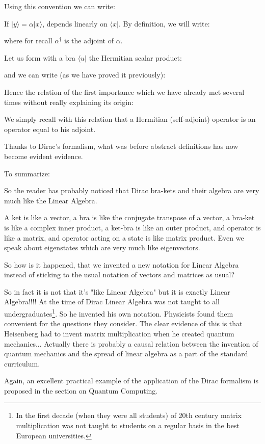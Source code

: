 	Using this convention we can write:
	
	If $|y\rangle=\alpha|x\rangle$, depends linearly on $\langle x|$. By definition, we will write:
	
	where for recall $\alpha^\dagger$ is the adjoint of $\alpha$.
	
	Let us form with a bra $\langle u|$ the Hermitian scalar product:
	
	and we can write (as we have proved it previously):
	
	Hence the relation of the first importance which we have already met several times without really explaining its origin:
	
	We simply recall with this relation that a Hermitian (self-adjoint) operator is an operator equal to his adjoint.

	Thanks to Dirac's formalism, what was before abstract definitions has now become evident evidence.

	To summarize:
	\setlength\extrarowheight{10pt}
	
	\setlength\extrarowheight{0pt}
	So the reader has probably noticed that Dirac bra-kets and their algebra are very much like the Linear Algebra.

	A ket is like a vector, a bra is like the conjugate transpose of a vector, a bra-ket is like a complex inner product, a ket-bra is like an outer product, and operator is like a matrix, and operator acting on a state is like matrix product. Even we speak about eigenstates which are very much like eigenvectors.

	So how is it happened, that we invented a new notation for Linear Algebra instead of sticking to the usual notation of vectors and matrices as usual?

	So in fact it is not that it's "like Linear Algebra" but it is exactly Linear Algebra!!!! At the time of Dirac Linear Algebra was not taught to all undergraduates\footnote{In the first decade (when they were all students) of 20th century matrix multiplication was not taught to students on a regular basis in the best European universities.}. So he invented his own notation. Physicists found them convenient for the questions they consider. The clear evidence of this is that Heisenberg had to invent matrix multiplication when he created quantum mechanics... Actually there is probably a causal relation between the invention of quantum mechanics and the spread of linear algebra as a part of the standard curriculum.
	
	\begin{tcolorbox}[title=Remark,colframe=black,arc=10pt]
	Again, an excellent practical example of the application of the Dirac formalism is proposed in the section on Quantum Computing.
	\end{tcolorbox}
	
